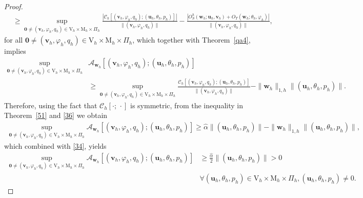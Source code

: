 \documentclass[10pt,a4paper]{article}
\begin{document}
\begin{proof}
$$\begin{aligned}
  			& \geq \sup _{\boldsymbol{0} \neq(\boldsymbol{v}_h, \varphi_h, q_h) \in \mathrm{V}_h \times \mathrm{M}_h \times \Pi_h} \frac{|\mathcal{C}_h\left[(\boldsymbol{v}_h, \varphi_h, q_h);(\boldsymbol{u}_h, \theta_h, p_h)\right]|}{\|( \boldsymbol{v}_h,\varphi_h,q_h)\|}-\frac{|{O}_S^h(\boldsymbol{w}_h ; \boldsymbol{u}_h, \boldsymbol{v}_h) + O_T(\boldsymbol{w}_h; \theta_h, \varphi_h)|}{\|( \boldsymbol{v}_h, \varphi_h, q_h)\|},
  			\end{aligned}
  			$$
  			for all $\boldsymbol{0} \neq (\boldsymbol{v}_h, \varphi_h, q_h) \in \mathrm{V}_h \times \mathrm{M}_h \times \Pi_h $, which together with Theorem~\ref{qa4}, implies
  			\begin{align}\label{36}
  			\sup _{\boldsymbol{0} \neq (\boldsymbol{v}_h,\varphi_h, q_h) \in \mathrm{V}_h \times \mathrm{M}_h \times  \Pi_h} & \mathcal{A}_{\boldsymbol{w}_h}\left[(\boldsymbol{v}_h, \varphi_h, q_h);(\boldsymbol{u}_h,\theta_h, p_h)\right] \\ & \geq \sup _{\boldsymbol{0} \neq ( \boldsymbol{v}_h,\varphi_h, q_h) \in \mathrm{V}_h \times \mathrm{M}_h \times  \Pi_h} \frac{\mathcal{C}_h\left[( \boldsymbol{v}_h, \varphi_h, q_h);(\boldsymbol{u}_h, \theta_h, p_h)\right]}{\|(\boldsymbol{v}_h, \varphi_h, q_h)\|}-\|\boldsymbol{w}_h\|_{1,h}\|( \boldsymbol{u}_h, \theta_h, p_h)\|.
  			\end{align}
  			Therefore, using the fact that $\mathcal{C}_h\left[\cdot ;\, \cdot\right]$ is symmetric, from the inequality in Theorem~\ref{51} and \eqref{36} we obtain
  			\begin{align*}
  			\sup _{\boldsymbol{0} \neq (\boldsymbol{v}_h, \varphi_h, q_h) \in \mathrm{V}_h \times \mathrm{M}_h \times  \Pi_h} \mathcal{A}_{\boldsymbol{w}_h}\left[( \boldsymbol{v}_h, \varphi_h, q_h);(\boldsymbol{u}_h, \theta_h, p_h)\right] \geq \hat{\alpha} \|( \boldsymbol{u}_h, \theta_h, p_h)\|-\|\boldsymbol{w}_h\|_{1,h}\|( \boldsymbol{u}_h, \theta_h, p_h)\|,
  			\end{align*}
  			which combined with \eqref{34}, yields
  			\begin{align}\label{37}
  			\sup _{\boldsymbol{0} \neq (\boldsymbol{v}_h, \varphi_h, q_h) \in \mathrm{V}_h \times \mathrm{M}_h \times \Pi_h} \mathcal{A}_{\boldsymbol{w}_h}\left[(\boldsymbol{v}_h, \varphi_h, q_h);(\boldsymbol{u}_h, \theta_h, p_h)\right] & \geq \frac{\hat{\alpha}}{2}\|(\boldsymbol{u}_h, \theta_h, p_h)\| >0  \\ & \forall(\boldsymbol{u}_h,\theta_h, p_h) \in \mathrm{V}_h \times \mathrm{M}_h \times \Pi_h,(\boldsymbol{u}_h, \theta_h, p_h) \neq 0.

\end{align}
\end{proof}
\end{document}
